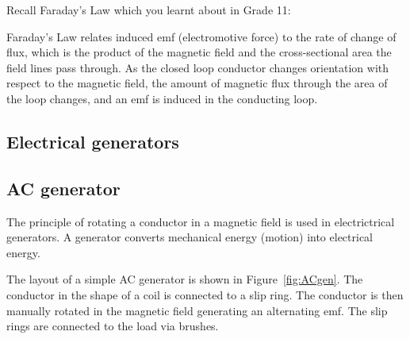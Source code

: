 Recall Faraday's Law which you learnt about in Grade 11:


Faraday's Law relates induced emf (electromotive force) to the rate of change of flux,
which is the product of the magnetic field and the cross-sectional
area the field lines pass through.
As the closed loop conductor changes orientation with respect to the magnetic field, the amount of magnetic flux through the area of the loop changes, and an emf is induced in the conducting loop. 


\subsection{Electrical generators}

\subsection*{AC generator}
The principle of rotating a conductor in a magnetic field is used in electrictrical generators. A generator converts mechanical energy (motion) into electrical energy.
 

The layout of a simple AC generator is shown in Figure~\ref{fig:ACgen}. The conductor in the shape of a coil is connected to a slip ring. The conductor is then manually rotated in the magnetic field generating an alternating emf. The slip rings are connected to the load via brushes.


